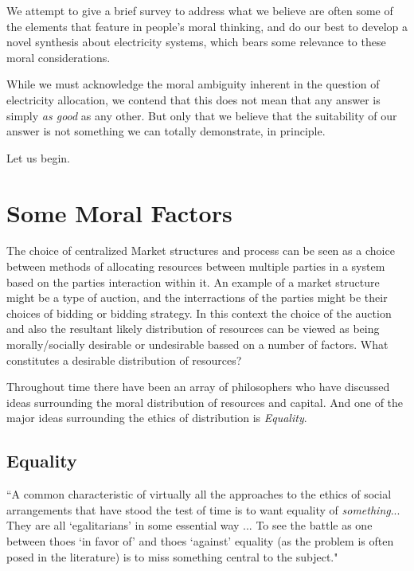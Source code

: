 We attempt to give a brief survey to address what we believe are often some of the elements that feature in people's moral thinking, and do our best to develop a novel synthesis about electricity systems, which bears some relevance to these moral considerations.

While we must acknowledge the moral ambiguity inherent in the question of electricity allocation, we contend that this does not mean that any answer is simply \textit{as good} as any other. But only that we believe that the suitability of our answer is not something we can totally demonstrate, in principle.

Let us begin.

\section{Some Moral Factors}

The choice of centralized Market structures and process can be seen as a choice between methods of allocating resources between multiple parties in a system based on the parties interaction within it.
An example of a market structure might be a type of auction, and the interractions of the parties might be their choices of bidding or bidding strategy.
In this context the choice of the auction and also the resultant likely distribution of resources can be viewed as being morally/socially desirable or undesirable bassed on a number of factors.
What constitutes a desirable distribution of resources?


Throughout time there have been an array of philosophers who have discussed ideas surrounding the moral distribution of resources and capital. And one of the major ideas surrounding the ethics of distribution is \textit{Equality}.

\subsection{Equality}

\begin{displayquote}
``A common characteristic of virtually all the approaches to the ethics of social arrangements that have stood the test of time is to want equality of \textit{something}... They are all `egalitarians' in some essential way ... To see the battle as one between thoes `in favor of' and thoes `against' equality (as the problem is often posed in the literature) is to miss something central to the subject."\cite[Chapter 1]{18084} 
\end{displayquote}


